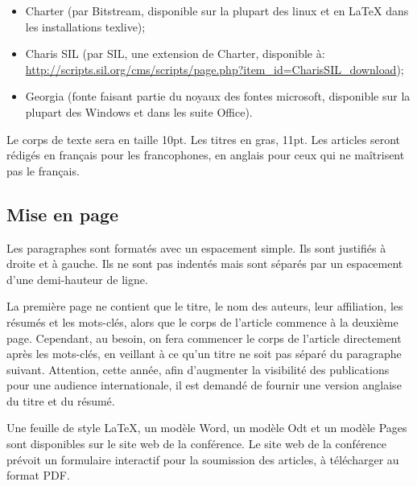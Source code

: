 \documentclass[10pt,a4paper,twoside]{article}
\begin{document}
\begin{itemize}
\item Charter (par Bitstream, disponible sur la plupart des linux et en \LaTeX{} dans les installations texlive);
\item Charis SIL (par SIL, une extension de Charter, disponible à:\\ \href{http://scripts.sil.org/cms/scripts/page.php?item_id=CharisSIL_download}{http://scripts.sil.org/cms/scripts/page.php?item\_id=CharisSIL\_download});
\item Georgia (fonte faisant partie du noyaux des fontes microsoft, disponible sur la plupart des Windows et dans les suite Office).
\end{itemize} 

Le corps de texte sera en taille 10pt. Les titres en gras, 11pt. Les articles seront rédigés en français pour les francophones, en anglais pour ceux qui ne maîtrisent pas le français.

\subsection{Mise en page}

Les paragraphes sont formatés avec un espacement simple. Ils sont justifiés à droite et à gauche. Ils ne sont pas indentés mais sont séparés par un espacement d'une demi-hauteur de ligne.

La première page ne contient que le titre, le nom des auteurs, leur affiliation, les résumés et les mots-clés, alors que le corps de l’article commence à la deuxième page. Cependant, au besoin, on fera commencer le corps de l’article directement après les mots-clés, en veillant à ce qu’un titre ne soit pas séparé du paragraphe suivant. Attention, cette année, afin d'augmenter la visibilité des publications pour une audience internationale, il est demandé de fournir une version anglaise du titre et du résumé.



Une feuille de style LaTeX, un modèle Word, un modèle Odt et un modèle Pages sont disponibles sur le site web de la conférence. Le site web de la conférence prévoit un formulaire interactif pour la soumission des articles, à télécharger au format PDF. 
\end{document}
